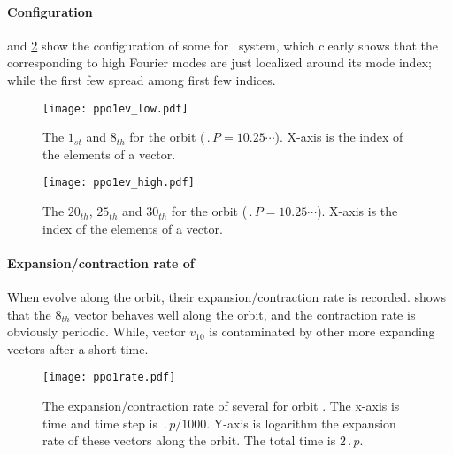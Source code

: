 	\paragraph{Configuration}
		 and \ref{fig:ppo1ev_high} show the configuration of some {\cLvs} for \KS\ system,
		which clearly shows that the {\cLvs} corresponding to high Fourier modes are just localized around
		its mode index; while the first few {\cLvs} spread among first few indices.
		\begin{figure}[h]
		\centering
			\texttt{[image: ppo1ev\_low.pdf]}
			\caption{The $1_{st}$ and $8_{th}$ \cLvs for the  orbit ($\period{P}=10.25\cdots$).
			X-axis is the index of the elements of a vector.
			}
			\label{fig:ppo1ev_low}
		\end{figure}

		\begin{figure}[h]
		\centering
			\texttt{[image: ppo1ev\_high.pdf]}
			\caption{The $20_{th}$, $25_{th}$ and $30_{th}$ \cLvs for the  orbit ($\period{P}=10.25\cdots$).
			X-axis is the index of the elements of a vector.
			}
			\label{fig:ppo1ev_high}
		\end{figure}

	\paragraph{Expansion/contraction rate of \cLvs}
		When {\cLvs} evolve along the orbit, their expansion/contraction rate is recorded. 
		shows that the $8_{th}$ vector behaves well along the orbit, and the contraction rate is obviously periodic.
		While, vector $v_{10}$ is contaminated by other more expanding vectors after a short time. 
		\begin{figure}[h]
		\centering
			\texttt{[image: ppo1rate.pdf]}
			\caption{ The expansion/contraction rate of several {\cLvs} for orbit . The x-axis is time and
			time step is $\period{p}/1000$. Y-axis is logarithm the expansion rate of these vectors along the orbit. The total
			time is $2\period{p}$.
			}
			\label{fig:ppo1rate}
		\end{figure}
	
